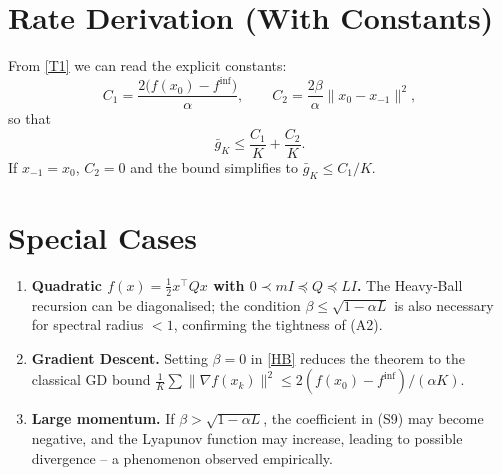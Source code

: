 \documentclass{article}
\begin{document}
\section*{Rate Derivation (With Constants)}
From \eqref{T1} we can read the explicit constants:
\[
C_{1}= \frac{2\bigl(f(x_{0})-f^{\inf}\bigr)}{\alpha},\qquad
C_{2}= \frac{2\beta}{\alpha}\|x_{0}-x_{-1}\|^{2},
\]
so that
\[
\bar{g}_{K}\le \frac{C_{1}}{K}+\frac{C_{2}}{K}.
\]
If $x_{-1}=x_{0}$, $C_{2}=0$ and the bound simplifies to $\bar{g}_{K}\le C_{1}/K$.

\section*{Special Cases}
\begin{enumerate}
\item \textbf{Quadratic $f(x)=\tfrac12 x^{\top}Qx$ with $0\prec mI\preceq Q\preceq LI$.}  
The Heavy‑Ball recursion can be diagonalised; the condition $\beta\le\sqrt{1-\alpha L}$ is also necessary for spectral radius $<1$, confirming the tightness of (A2).

\item \textbf{Gradient Descent.} Setting $\beta=0$ in \eqref{HB} reduces the theorem to the classical GD bound $\frac{1}{K}\sum\|\nabla f(x_{k})\|^{2}\le 2(f(x_{0})-f^{\inf})/(\alpha K)$.

\item \textbf{Large momentum.} If $\beta>\sqrt{1-\alpha L}$, the coefficient in (S9) may become negative, and the Lyapunov function may increase, leading to possible divergence – a phenomenon observed empirically.
\end{enumerate}
\end{document}
